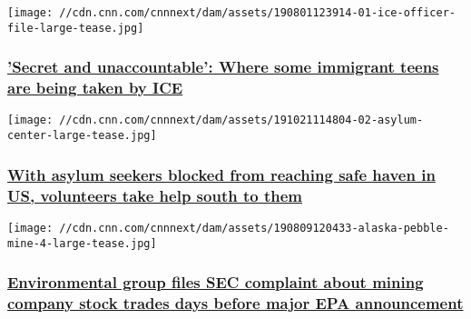 \href{/2019/10/24/us/ice-kids-detention-invs/index.html}{}

\texttt{[image: //cdn.cnn.com/cnnnext/dam/assets/190801123914-01-ice-officer-file-large-tease.jpg]}

\hypertarget{secret-and-unaccountable-where-some-immigrant-teens-are-being-taken-by-ice-}{%
\subsubsection{\texorpdfstring{\href{/2019/10/24/us/ice-kids-detention-invs/index.html}{'Secret
and unaccountable': Where some immigrant teens are being taken by ICE
}}{'Secret and unaccountable': Where some immigrant teens are being taken by ICE }}\label{secret-and-unaccountable-where-some-immigrant-teens-are-being-taken-by-ice-}}

\href{/2019/10/22/us/asylum-center-ice-inv/index.html}{}

\texttt{[image: //cdn.cnn.com/cnnnext/dam/assets/191021114804-02-asylum-center-large-tease.jpg]}

\hypertarget{with-asylum-seekers-blocked-from-reaching-safe-haven-in-us-volunteers-take-help-south-to-them}{%
\subsubsection{\texorpdfstring{\href{/2019/10/22/us/asylum-center-ice-inv/index.html}{With
asylum seekers blocked from reaching safe haven in US, volunteers take
help south to
them}}{With asylum seekers blocked from reaching safe haven in US, volunteers take help south to them}}\label{with-asylum-seekers-blocked-from-reaching-safe-haven-in-us-volunteers-take-help-south-to-them}}

\href{/2019/10/21/politics/pebble-mine-alaska-insider-trading-invs/index.html}{}

\texttt{[image: //cdn.cnn.com/cnnnext/dam/assets/190809120433-alaska-pebble-mine-4-large-tease.jpg]}

\hypertarget{environmental-group-files-sec-complaint-about-mining-company-stock-trades-days-before-major-epa-announcement}{%
\subsubsection{\texorpdfstring{\href{/2019/10/21/politics/pebble-mine-alaska-insider-trading-invs/index.html}{Environmental
group files SEC complaint about mining company stock trades days before
major EPA
announcement}}{Environmental group files SEC complaint about mining company stock trades days before major EPA announcement}}\label{environmental-group-files-sec-complaint-about-mining-company-stock-trades-days-before-major-epa-announcement}}

